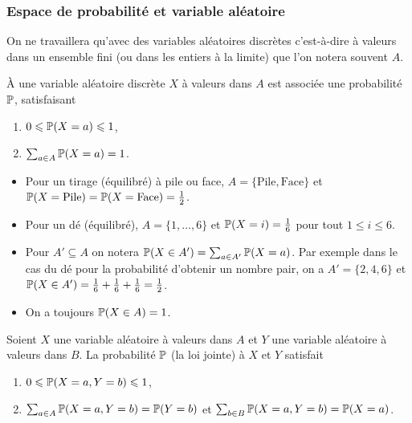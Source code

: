 \subsubsection{Espace de probabilité et variable aléatoire}

On ne travaillera qu'avec des variables aléatoires discrètes c'est-à-dire à valeurs dans un ensemble fini (ou dans les entiers à la limite) que l'on notera souvent $A$.


\begin{dfn}
À une variable aléatoire discrète $X$ à valeurs dans $A$ est associée une probabilité $\operatorname{\mathbb P}$, satisfaisant
\begin{enumerate}
\item $0\leqslant\operatorname{\mathbb P}(X = a)\leqslant1$,
\item $\sum_{a\in A}\operatorname{\mathbb P}(X = a) = 1$.
\end{enumerate}
\end{dfn}

\begin{ex}
\begin{itemize}
\item Pour un tirage (équilibré) à pile ou face, $A = \{\text{Pile}, \text{Face}\}$
et $\operatorname{\mathbb P}(X = \text{Pile}) = \operatorname{\mathbb P}(X = \text{Face}) = \frac12$.
\item Pour un dé (équilibré), $A = \{1, \dots, 6\}$ et $\operatorname{\mathbb P}(X = i) = \frac16$
pour tout $1\le i\le6$.
\item Pour $A'\subseteq A$ on notera $\operatorname{\mathbb P}(X\in A') = \sum_{a\in A'}\operatorname{\mathbb P}(X = a)$. Par exemple dans le cas du dé pour la probabilité d'obtenir un nombre pair, on a $A' = \{2, 4, 6\}$ et $\operatorname{\mathbb P}(X\in A') = \frac16 + \frac16 + \frac16 = \frac12$.
\item On a toujours $\operatorname{\mathbb P}(X\in A) = 1$.
\end{itemize}
\end{ex}


\begin{dfn}
Soient $X$ une variable aléatoire à valeurs dans $A$ et $Y$ une variable aléatoire à valeurs dans $B$. La probabilité $\operatorname{\mathbb P}$ (la loi jointe) à $X$ et $Y$ satisfait
\begin{enumerate}
\item $0\leqslant\operatorname{\mathbb P}(X = a, Y = b) \leqslant 1$,
\item $\sum_{a\in A}\operatorname{\mathbb P}(X = a, Y = b) = \operatorname{\mathbb P}(Y = b)$ et $\sum_{b\in B}\operatorname{\mathbb P}(X = a, Y = b) = \operatorname{\mathbb P}(X = a)$.
\end{enumerate}
\end{dfn}

